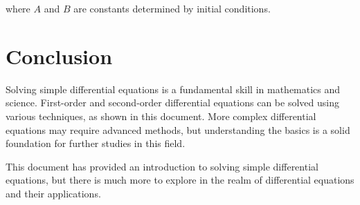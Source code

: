 \documentclass{article}
\begin{document}
where $A$ and $B$ are constants determined by initial conditions.

\section{Conclusion}

Solving simple differential equations is a fundamental skill in mathematics and science. First-order and second-order differential equations can be solved using various techniques, as shown in this document. More complex differential equations may require advanced methods, but understanding the basics is a solid foundation for further studies in this field.

This document has provided an introduction to solving simple differential equations, but there is much more to explore in the realm of differential equations and their applications.
\end{document}
